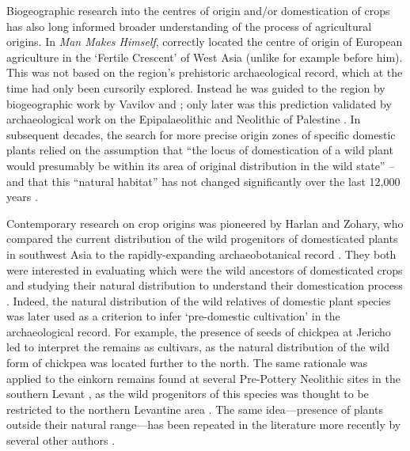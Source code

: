 \documentclass[
  authoryear,
  preprint]{elsarticle}
\begin{document}
Biogeographic research into the centres of origin and/or domestication
of crops has also long informed broader understanding of the process of
agricultural origins. In \emph{Man Makes Himself}, \citet{Childe1936}
correctly located the centre of origin of European agriculture in the
`Fertile Crescent' of West Asia (unlike for example \citet{Pumpelly1908}
before him). This was not based on the region's prehistoric
archaeological record, which at the time had only been cursorily
explored. Instead he was guided to the region by biogeographic work by
Vavilov and \citet{PeakeFleure1927}; only later was this prediction
validated by archaeological work on the Epipalaeolithic and Neolithic of
Palestine \citep{Boyd2018}. In subsequent decades, the search for more
precise origin zones of specific domestic plants relied on the
assumption that ``the locus of domestication of a wild plant would
presumably be within its area of original distribution in the wild
state''
\citetext{\citealp{Butzer1971}; \citealp[paraphrasing][]{Helbaek1959}}
-- and that this ``natural habitat'' has not changed significantly over
the last 12,000 years \citep{Butzer1971}.

Contemporary research on crop origins was pioneered by Harlan and
Zohary, who compared the current distribution of the wild progenitors of
domesticated plants in southwest Asia
\citep{HarlanZohary1966, Zohary1969, Zohary1973, ZoharyHopf1973} to the
rapidly-expanding archaeobotanical record
\citetext{\citealp{Harlan1971}; \citealp{Harlan1977}; \citealp[see
also][]{ZoharyHopf1988}; \citealp{HarlanZohary1966}}. They both were
interested in evaluating which were the wild ancestors of domesticated
crops and studying their natural distribution to understand their
domestication process
\citep{Zohary1969, Zohary1973, ZoharySpiegelRoy1975}. Indeed, the
natural distribution of the wild relatives of domestic plant species was
later used as a criterion to infer `pre-domestic cultivation' in the
archaeological record. For example, the presence of seeds of chickpea at
Jericho led \citet{Hopf1986} to interpret the remains as cultivars, as
the natural distribution of the wild form of chickpea was located
further to the north. The same rationale was applied to the einkorn
remains found at several Pre-Pottery Neolithic sites in the southern
Levant \citep{Hopf1969, Colledge2001}, as the wild progenitors of this
species was thought to be restricted to the northern Levantine area
\citep{HeunEtAl1997, ZoharyEtAl2012}. The same idea---presence of plants
outside their natural range---has been repeated in the literature more
recently by several other authors
\citep{TannoWillcox2006, WillcoxEtAl2008, HillmanEtAl2001}.
\end{document}
